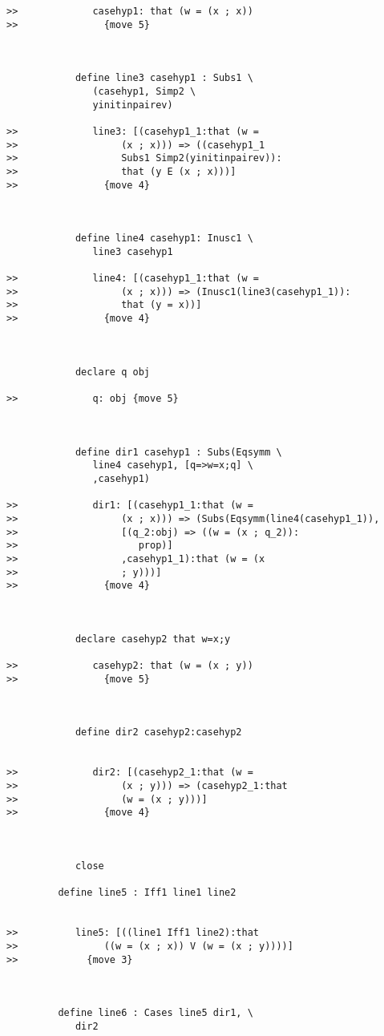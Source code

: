 \documentclass[12pt]{article}
\begin{document}
\begin{verbatim}
>>             casehyp1: that (w = (x ; x))
>>               {move 5}



            define line3 casehyp1 : Subs1 \
               (casehyp1, Simp2 \
               yinitinpairev)

>>             line3: [(casehyp1_1:that (w =
>>                  (x ; x))) => ((casehyp1_1
>>                  Subs1 Simp2(yinitinpairev)):
>>                  that (y E (x ; x)))]
>>               {move 4}



            define line4 casehyp1: Inusc1 \
               line3 casehyp1

>>             line4: [(casehyp1_1:that (w =
>>                  (x ; x))) => (Inusc1(line3(casehyp1_1)):
>>                  that (y = x))]
>>               {move 4}



            declare q obj

>>             q: obj {move 5}



            define dir1 casehyp1 : Subs(Eqsymm \
               line4 casehyp1, [q=>w=x;q] \
               ,casehyp1)

>>             dir1: [(casehyp1_1:that (w =
>>                  (x ; x))) => (Subs(Eqsymm(line4(casehyp1_1)),
>>                  [(q_2:obj) => ((w = (x ; q_2)):
>>                     prop)]
>>                  ,casehyp1_1):that (w = (x
>>                  ; y)))]
>>               {move 4}



            declare casehyp2 that w=x;y

>>             casehyp2: that (w = (x ; y))
>>               {move 5}



            define dir2 casehyp2:casehyp2


>>             dir2: [(casehyp2_1:that (w =
>>                  (x ; y))) => (casehyp2_1:that
>>                  (w = (x ; y)))]
>>               {move 4}



            close

         define line5 : Iff1 line1 line2


>>          line5: [((line1 Iff1 line2):that
>>               ((w = (x ; x)) V (w = (x ; y))))]
>>            {move 3}



         define line6 : Cases line5 dir1, \
            dir2


\end{verbatim}
\end{document}
